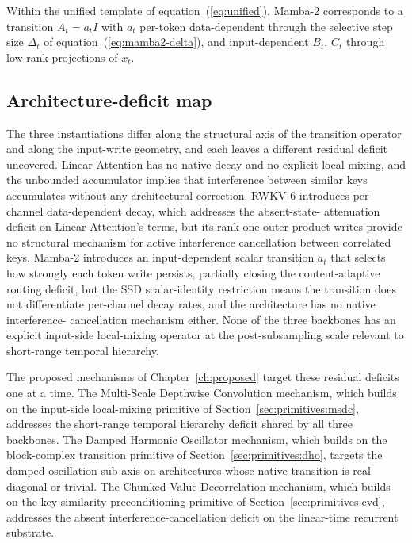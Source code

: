 Within the unified template of equation~(\ref{eq:unified}),
Mamba-2 corresponds to a transition $A_{t} = a_{t} I$ with $a_{t}$
per-token data-dependent through the selective step size
$\Delta_{t}$ of equation~(\ref{eq:mamba2-delta}), and
input-dependent $B_{t}$, $C_{t}$ through low-rank projections of
$x_{t}$.

\subsection{Architecture-deficit map}\label{sec:backbones:deficit}

The three instantiations differ along the structural axis of the
transition operator and along the input-write geometry, and each
leaves a different residual deficit uncovered. Linear Attention has
no native decay and no explicit local mixing, and the unbounded
accumulator implies that interference between similar keys
accumulates without any architectural correction. RWKV-6 introduces
per-channel data-dependent decay, which addresses the absent-state-
attenuation deficit on Linear Attention's terms, but its rank-one
outer-product writes provide no structural mechanism for active
interference cancellation between correlated keys. Mamba-2 introduces
an input-dependent scalar transition $a_{t}$ that selects how
strongly each token write persists, partially closing the
content-adaptive routing deficit, but the SSD scalar-identity
restriction means the transition does not differentiate per-channel
decay rates, and the architecture has no native interference-
cancellation mechanism either. None of the three backbones has an
explicit input-side local-mixing operator at the post-subsampling
scale relevant to short-range temporal hierarchy.

The proposed mechanisms of Chapter~\ref{ch:proposed} target these
residual deficits one at a time. The Multi-Scale Depthwise
Convolution mechanism, which builds on the input-side local-mixing
primitive of Section~\ref{sec:primitives:msdc}, addresses the
short-range temporal hierarchy deficit shared by all three backbones.
The Damped Harmonic Oscillator mechanism, which builds on the
block-complex transition primitive of
Section~\ref{sec:primitives:dho}, targets the damped-oscillation
sub-axis on architectures whose native transition is real-diagonal
or trivial. The Chunked Value Decorrelation mechanism, which builds
on the key-similarity preconditioning primitive of
Section~\ref{sec:primitives:cvd}, addresses the absent
interference-cancellation deficit on the linear-time recurrent
substrate.

